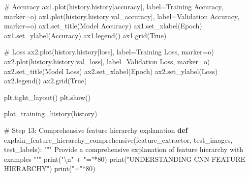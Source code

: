 \documentclass[
  letterpaper,
  DIV=11,
  numbers=noendperiod]{scrreprt}
\newenvironment{Shaded}{\begin{snugshade}}{\end{snugshade}}
\newcommand{\BuiltInTok}[1]{\textcolor[rgb]{0.00,0.23,0.31}{#1}}
\newcommand{\CharTok}[1]{\textcolor[rgb]{0.13,0.47,0.30}{#1}}
\newcommand{\CommentTok}[1]{\textcolor[rgb]{0.37,0.37,0.37}{#1}}
\newcommand{\DecValTok}[1]{\textcolor[rgb]{0.68,0.00,0.00}{#1}}
\newcommand{\KeywordTok}[1]{\textcolor[rgb]{0.00,0.23,0.31}{\textbf{#1}}}
\newcommand{\NormalTok}[1]{\textcolor[rgb]{0.00,0.23,0.31}{#1}}
\newcommand{\OperatorTok}[1]{\textcolor[rgb]{0.37,0.37,0.37}{#1}}
\newcommand{\StringTok}[1]{\textcolor[rgb]{0.13,0.47,0.30}{#1}}
\newcommand{\VariableTok}[1]{\textcolor[rgb]{0.07,0.07,0.07}{#1}}
\begin{document}
\begin{Shaded}
\begin{Highlighting}[]
    \CommentTok{\# Accuracy}
\NormalTok{    ax1.plot(history.history[}\StringTok{\textquotesingle{}accuracy\textquotesingle{}}\NormalTok{], label}\OperatorTok{=}\StringTok{\textquotesingle{}Training Accuracy\textquotesingle{}}\NormalTok{, marker}\OperatorTok{=}\StringTok{\textquotesingle{}o\textquotesingle{}}\NormalTok{)}
\NormalTok{    ax1.plot(history.history[}\StringTok{\textquotesingle{}val\_accuracy\textquotesingle{}}\NormalTok{], label}\OperatorTok{=}\StringTok{\textquotesingle{}Validation Accuracy\textquotesingle{}}\NormalTok{, marker}\OperatorTok{=}\StringTok{\textquotesingle{}o\textquotesingle{}}\NormalTok{)}
\NormalTok{    ax1.set\_title(}\StringTok{\textquotesingle{}Model Accuracy\textquotesingle{}}\NormalTok{)}
\NormalTok{    ax1.set\_xlabel(}\StringTok{\textquotesingle{}Epoch\textquotesingle{}}\NormalTok{)}
\NormalTok{    ax1.set\_ylabel(}\StringTok{\textquotesingle{}Accuracy\textquotesingle{}}\NormalTok{)}
\NormalTok{    ax1.legend()}
\NormalTok{    ax1.grid(}\VariableTok{True}\NormalTok{)}
    
    \CommentTok{\# Loss}
\NormalTok{    ax2.plot(history.history[}\StringTok{\textquotesingle{}loss\textquotesingle{}}\NormalTok{], label}\OperatorTok{=}\StringTok{\textquotesingle{}Training Loss\textquotesingle{}}\NormalTok{, marker}\OperatorTok{=}\StringTok{\textquotesingle{}o\textquotesingle{}}\NormalTok{)}
\NormalTok{    ax2.plot(history.history[}\StringTok{\textquotesingle{}val\_loss\textquotesingle{}}\NormalTok{], label}\OperatorTok{=}\StringTok{\textquotesingle{}Validation Loss\textquotesingle{}}\NormalTok{, marker}\OperatorTok{=}\StringTok{\textquotesingle{}o\textquotesingle{}}\NormalTok{)}
\NormalTok{    ax2.set\_title(}\StringTok{\textquotesingle{}Model Loss\textquotesingle{}}\NormalTok{)}
\NormalTok{    ax2.set\_xlabel(}\StringTok{\textquotesingle{}Epoch\textquotesingle{}}\NormalTok{)}
\NormalTok{    ax2.set\_ylabel(}\StringTok{\textquotesingle{}Loss\textquotesingle{}}\NormalTok{)}
\NormalTok{    ax2.legend()}
\NormalTok{    ax2.grid(}\VariableTok{True}\NormalTok{)}
    
\NormalTok{    plt.tight\_layout()}
\NormalTok{    plt.show()}

\NormalTok{plot\_training\_history(history)}

\CommentTok{\# Step 13: Comprehensive feature hierarchy explanation}
\KeywordTok{def}\NormalTok{ explain\_feature\_hierarchy\_comprehensive(feature\_extractor, test\_images, test\_labels):}
    \CommentTok{"""}
\CommentTok{    Provide a comprehensive explanation of feature hierarchy with examples}
\CommentTok{    """}
    \BuiltInTok{print}\NormalTok{(}\StringTok{"}\CharTok{\textbackslash{}n}\StringTok{"} \OperatorTok{+} \StringTok{"="}\OperatorTok{*}\DecValTok{80}\NormalTok{)}
    \BuiltInTok{print}\NormalTok{(}\StringTok{"UNDERSTANDING CNN FEATURE HIERARCHY"}\NormalTok{)}
    \BuiltInTok{print}\NormalTok{(}\StringTok{"="}\OperatorTok{*}\DecValTok{80}\NormalTok{)}
    

\end{Highlighting}
\end{Shaded}
\end{document}
